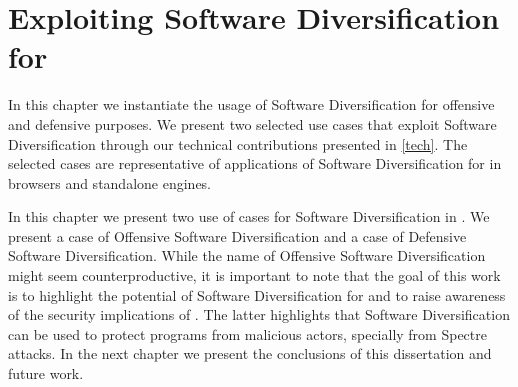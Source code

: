 \chapter{Exploiting Software Diversification for \Wasm}
\label{exploit}

In this chapter we instantiate the usage of Software Diversification for offensive and defensive purposes.
We present two selected use cases that exploit Software Diversification through our technical contributions presented in \autoref{tech}.
The selected cases are representative of applications of Software Diversification for \Wasm in browsers and standalone engines.







% 


In this chapter we present two use of cases for Software Diversification in \Wasm.
We present a case of Offensive Software Diversification and a case of Defensive Software Diversification.
While the name of Offensive Software Diversification might seem counterproductive, it is important to note that the goal of this work is to highlight the potential of Software Diversification for \Wasm and to raise awareness of the security implications of \Wasm.
The latter highlights that Software Diversification can be used to protect \Wasm programs from malicious actors, specially from Spectre attacks.
In the next chapter we present the conclusions of this dissertation and future work.